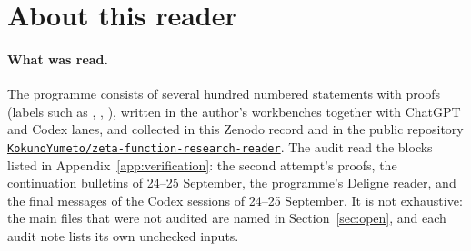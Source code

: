 \begin{abstract}
\noindent
This reader sets out what the split-zero programme around the Riemann zeta function has established, as found in an audit of the programme's files carried out between 22 and 26 September 2026.
The programme studies the zeros of $\zeta$ through the Hurwitz sheets $\zeta(s,1+t)$, through quotient modules of entire functions attached to the zeros (Meyer's zeta quotient and its relatives), and through arithmetic, cohomological and positivity constructions modelled on Weil's explicit formula and on Deligne's proof of the Weil conjectures.
The reader has three parts.
Sections~\ref{sec:sheets}--\ref{sec:other} state the proved results; the central ones are proved in full here, and every other one is given with the exact location of its proof.
Section~\ref{sec:negative} states the routes that are proved \emph{not} to decide the location of the zeros by themselves, each with the precise scope of what fails and, where the notes identify it, the additional input that would be needed.
Sections~\ref{sec:bridges}--\ref{sec:open} record the identified connections with other fields and with the author's other workbenches, and the questions that remain open.
Nothing in this reader proves or disproves the Riemann hypothesis, and no result is presented as doing so.
\end{abstract}

\section*{About this reader}\label{sec:about}

\paragraph{What was read.}
The programme consists of several hundred numbered statements with proofs (labels such as , , ), written in the author's workbenches together with ChatGPT and Codex lanes, and collected in this Zenodo record and in the public repository \href{https://github.com/KokunoYumeto/zeta-function-research-reader}{\texttt{KokunoYumeto/\allowbreak zeta-function-\allowbreak research-reader}}.
The audit read the blocks listed in Appendix~\ref{app:verification}: the second attempt's proofs, the continuation bulletins of 24--25 September, the programme's Deligne reader, and the final messages of the Codex sessions of 24--25 September.
It is not exhaustive: the main files that were not audited are named in Section~\ref{sec:open}, and each audit note lists its own unchecked inputs.


